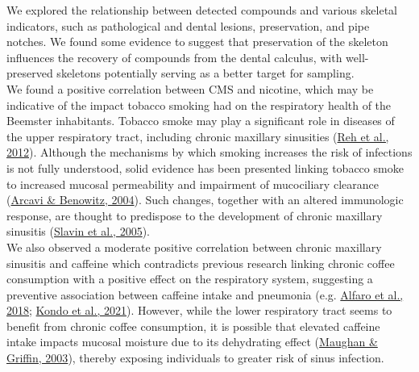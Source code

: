 \documentclass[
  b5paper,
]{book}
\begin{document}
We explored the relationship between detected compounds and various
skeletal indicators, such as pathological and dental lesions,
preservation, and pipe notches. We found some evidence to suggest that
preservation of the skeleton influences the recovery of compounds from
the dental calculus, with well-preserved skeletons potentially serving
as a better target for sampling.\\
We found a positive correlation between CMS and nicotine, which may be
indicative of the impact tobacco smoking had on the respiratory health
of the Beemster inhabitants. Tobacco smoke may play a significant role
in diseases of the upper respiratory tract, including chronic maxillary
sinusities (\protect\hyperlink{ref-rehImpactTobacco2012}{Reh et al.,
2012}). Although the mechanisms by which smoking increases the risk of
infections is not fully understood, solid evidence has been presented
linking tobacco smoke to increased mucosal permeability and impairment
of mucociliary clearance
(\protect\hyperlink{ref-arcaviCigaretteSmoking2004}{Arcavi \& Benowitz,
2004}). Such changes, together with an altered immunologic response, are
thought to predispose to the development of chronic maxillary sinusitis
(\protect\hyperlink{ref-slavinDiagnosisManagement2005}{Slavin et al.,
2005}).\\
We also observed a moderate positive correlation between chronic
maxillary sinusitis and caffeine which contradicts previous research
linking chronic coffee consumption with a positive effect on the
respiratory system, suggesting a preventive association between caffeine
intake and pneumonia (e.g.
\protect\hyperlink{ref-alfaroChronicCoffee2018}{Alfaro et al., 2018};
\protect\hyperlink{ref-kondoAssociationCoffee2021}{Kondo et al., 2021}).
However, while the lower respiratory tract seems to benefit from chronic
coffee consumption, it is possible that elevated caffeine intake impacts
mucosal moisture due to its dehydrating effect
(\protect\hyperlink{ref-maughanCaffeineIngestion2003}{Maughan \&
Griffin, 2003}), thereby exposing individuals to greater risk of sinus
infection.
\end{document}
